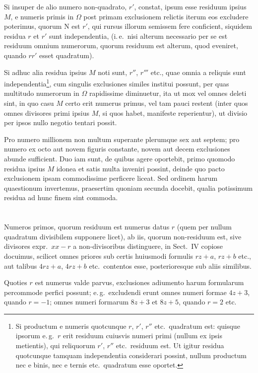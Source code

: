\documentclass[12pt,a4paper]{article}
\theoremstyle{plain}
\theoremstyle{definition}
\theoremstyle{remark}
\newcommand{\NR}{\mathrm{N}}
\begin{document}
Si insuper de alio numero non-quadrato, $r'$, constat, ipsum esse residuum ipsius $M$, e numeris primis in $\Omega$ post primam exclusionem relictis iterum eos excludere poterimus, quorum $\NR$ est $r'$, qui rursus illorum semissem fere conficient, siquidem residua $r$ et $r'$ sunt independentia, (i.\,e.\ nisi alterum necessario per se est residuum omnium numerorum, quorum residuum est alterum, quod eveniret, quando $rr'$ esset quadratum).

Si adhuc alia residua ipsius $M$ noti sunt, $r''$, $r'''$ etc., quae omnia a reliquis sunt independentia\footnote{Si productum e numeris quotcunque $r$, $r'$, $r''$ etc.\ quadratum est: quisque ipsorum e.\,g.\ $r$ erit residuum cuiusvis numeri primi (nullum ex ipsis metientis), qui reliquorum $r'$, $r''$ etc.\ residuum est. Ut igitur residua quotcunque tamquam independentia considerari possint, nullum productum nec e binis, nec e ternis etc.\ quadratum esse oportet.}, cum singulis exclusiones similes institui possunt, per quas multitudo numerorum in $\Omega$ rapidissime diminuetur, ita ut mox vel omnes deleti sint, in quo casu $M$ certo erit numerus primus, vel tam pauci restent (inter quos omnes divisores primi ipsius $M$, si quos habet, manifeste reperientur), ut divisio per ipsos nullo negotio tentari possit.

Pro numero millionem non multum superante plerumque sex aut septem; pro numero ex octo aut novem figuris constante, novem aut decem exclusiones abunde sufficient. Duo iam sunt, de quibus agere oportebit, primo quomodo residua ipsius $M$ idonea et satis multa inveniri possint, deinde quo pacto exclusionem ipsam commodissime perficere liceat. Sed ordinem harum quaestionum invertemus, praesertim quoniam secunda docebit, qualia potissimum residua ad hunc finem sint commoda.

\section{}

Numeros primos, quorum residuum est numerus datus $r$ (quem per nullum quadratum divisibilem supponere licet), ab iis, quorum non-residuum est, sive divisores expr.~$xx-r$ a non-divisoribus distinguere, in Sect.\ IV copiose docuimus, scilicet omnes priores sub certis huiusmodi formulis $rz+a$, $rz+b$ etc., aut talibus $4rz+a$, $4rz+b$ etc.\ contentos esse, posterioresque sub aliis similibus.

Quoties $r$ est numerus valde parvus, exclusiones adiumento harum formularum percommode perfici possunt; e.\,g.\ excludendi erunt omnes numeri formae $4z+3$, quando $r=-1$; omnes numeri formarum $8z+3$ et $8z+5$, quando $r=2$ etc.
\end{document}
